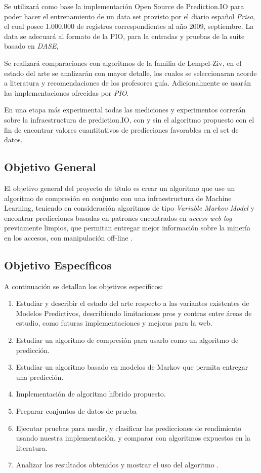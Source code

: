 \documentclass{udparticle}
\begin{document}
Se utilizará como base la implementación Open Source de Prediction.IO para poder hacer el entrenamiento de un data set provisto por el diario español \emph{Prisa}, el cual posee 1.000.000 de registros correspondientes al año 2009, septiembre. La data se adecuará al formato de la PIO, para la entradas y pruebas de la suite basado en \emph{DASE},

Se realizará comparaciones con algoritmos de la familia de Lempel-Ziv, en el estado del arte se analizarán con mayor detalle, los cuales se seleccionaran acorde a literatura y recomendaciones de los profesores guía. Adicionalmente se usarán las implementaciones ofrecidas por \emph{PIO}.

En una etapa más experimental todas las mediciones y experimentos correrán sobre la infraestructura de prediction.IO, con y sin el algoritmo propuesto con el fin de encontrar valores cuantitativos de predicciones favorables en el set de datos.


\subsection{Objetivo General}
 
El objetivo general del proyecto de título es crear un algoritmo que use un algoritmo de compresión en conjunto con una infraestructura de Machine Learning, teniendo en consideración algoritmos de tipo \emph{Variable Markov Model} y encontrar predicciones basadas en patrones encontrados en \emph{access web log} previamente limpios, que permitan entregar mejor información sobre la minería en los accesos, con manipulación off-line .
 
\subsection{Objetivo  Específicos }
 
A continuación se detallan los objetivos específicos:
 
\begin{enumerate}
  \item Estudiar y describir el estado del arte respecto a las variantes existentes de Modelos Predictivos, describiendo limitaciones pros y contras entre áreas de estudio, como futuras implementaciones y mejoras para la web.
  \item Estudiar un algoritmo de compresión para usarlo como un algoritmo de predicción.
  \item Estudiar un algoritmo basado en modelos de Markov que permita entregar una predicción.
  \item Implementación de algoritmo híbrido propuesto.
  \item Preparar conjuntos de datos de prueba 
  \item Ejecutar pruebas para medir, y clasificar las predicciones de rendimiento usando nuestra implementación, y comparar con algoritmos expuestos en la literatura.
  \item Analizar los resultados obtenidos y mostrar el uso del algoritmo .
\end{enumerate}
\end{document}
